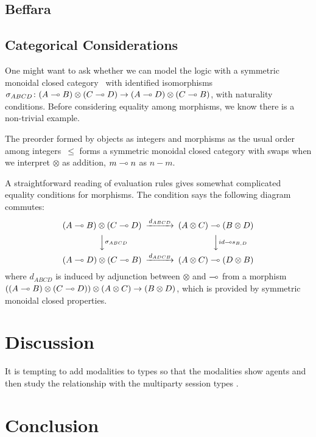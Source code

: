 \subsection{Beffara}

\subsection{Categorical Considerations}
One might want to ask whether we can model the logic with
a symmetric monoidal closed category~\citep{blute2004category}
  with identified isomorphisms
$\sigma_{ABCD}\colon (A\multimap B)\otimes (C\multimap D)\rightarrow (A\multimap D) \otimes
 (C\multimap B)$, with naturality conditions.
 Before considering equality among morphisms,
 we know there is a non-trivial example.
  \begin{example}
   The preorder formed by objects as integers and morphisms as the usual
   order among integers~$\le$
   forms a symmetric monoidal closed category with swaps
   when we interpret $\otimes$ as addition,
   $m \multimap n$ as $n-m$.
  \end{example}
A straightforward reading of evaluation rules gives somewhat complicated
equality conditions for morphisms.
The condition says the following diagram commutes:
\[
   \begin{CD}
    (A\limp B)\otimes (C\limp D) @>{d_{ABCD}}>> (A\otimes C)\limp(B\otimes D)\\
    @VV{\sigma_{ABCD}}V @VV{id\limp s_{B,D}}V\\
    (A\limp D)\otimes (C\limp B) @>{d_{ADCB}}>> (A\otimes C)\limp (D\otimes B)
   \end{CD}
\]
where $d_{ABCD}$ is induced by adjunction between $\otimes$ and $\multimap$
 from a morphism
 $((A\multimap B)\otimes (C\multimap D))\otimes (A\otimes C)\rightarrow
 (B\otimes D)$, which is provided by symmetric monoidal closed properties.

\section{Discussion}

It is tempting to add modalities to types so that the
modalities show agents and then study the relationship with the
multiparty session types .



\section{Conclusion}




